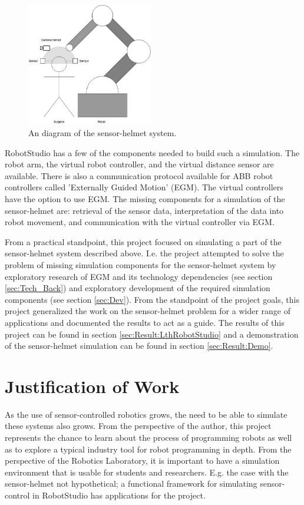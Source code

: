 \documentclass{cslthse-msc}
\begin{document}
\begin{figure}[H]
    \centering
    \includegraphics[width=5.5cm]{demo_mockup.jpg}
    \caption{An diagram of the sensor-helmet system.}
    \label{fig:demo_model}
\end{figure}
RobotStudio has a few of the components needed to build such a simulation. The robot arm, the virtual robot controller, and the virtual distance sensor are available. There is also a communication protocol available for ABB robot controllers called 'Externally Guided Motion' (EGM). The virtual controllers have the option to use EGM. The missing components for a simulation of the sensor-helmet are: retrieval of the sensor data, interpretation of the data into robot movement, and communication with the virtual controller via EGM.\par

From a practical standpoint, this project focused on simulating a part of the sensor-helmet system described above. I.e. the project attempted to solve the problem of missing simulation components for the sensor-helmet system by exploratory research of EGM and its technology dependencies (see section \ref{sec:Tech_Back}) and exploratory development of the required simulation components (see section \ref{sec:Dev}). From the standpoint of the project goals, this project generalized the work on the sensor-helmet problem for a wider range of applications and documented the results to act as a guide. The results of this project can be found in section \ref{sec:Result:LthRobotStudio} and a demonstration of the sensor-helmet simulation can be found in section \ref{sec:Result:Demo}. \par


\section{Justification of Work}
\label{sec:Intro:Justification}
As the use of sensor-controlled robotics grows, the need to be able to simulate these systems also grows. From the perspective of the author, this project represents the chance to learn about the process of programming robots as well as to explore a typical industry tool for robot programming in depth. From the perspective of the Robotics Laboratory, it is important to have a simulation environment that is usable for students and researchers. E.g. the case with the sensor-helmet not hypothetical; a functional framework for simulating sensor-control in RobotStudio has applications for the project. 
\end{document}
